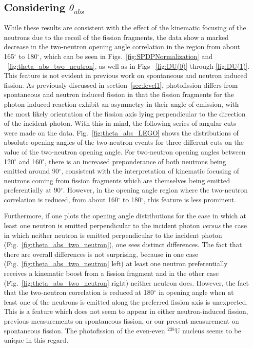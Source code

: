 \subsection{Considering $\theta_{abs}$}
\label{sec:anomaly}
While these results are consistent with the effect of the kinematic focusing of the neutrons due to the recoil of the fission fragments, the data show a marked decrease in the two-neutron opening angle correlation in the region from about 165$^{\circ}$ to 180$^{\circ}$, which can be seen in Figs.~\ref{fig:SPDPNormalization} and ~\ref{fig:theta_abs_two_neutron}, as well as in Figs ~\ref{fig:DU(0)} through \ref{fig:DU(1)}.
This feature is not evident in previous work on spontaneous and neutron induced fission.
As previously discussed in section~\ref{sec:level1}, photofission differs from spontaneous and neutron induced fission in that the fission fragments for the photon-induced reaction exhibit an asymmetry in their angle of emission, with the most likely orientation of the fission axis lying perpendicular to the direction of the incident photon.
With this in mind, the following series of angular cuts were made on the data.
Fig.~\ref{fig:theta_abs_LEGO} shows the distributions of absolute opening angles of the two-neutron events for three different cuts on the value of the two-neutron opening angle.
For two-neutron opening angles between 120$^{\circ}$ and 160$^{\circ}$, there is an increased preponderance of both neutrons being emitted around 90$^{\circ}$, consistent with the interpretation of kinematic focusing of neutrons coming from fission fragments which are themselves being emitted preferentially at 90$^{\circ}$.
However, in the opening angle region where the two-neutron correlation is reduced, from about 160$^{\circ}$ to 180$^{\circ}$, this feature is less prominent.

Furthermore, if one plots the opening angle distributions for the case in which at least one neutron is emitted perpendicular to the incident photon \emph{versus} the case in which neither neutron is emitted perpendicular to the incident photon (Fig.~\ref{fig:theta_abs_two_neutron}), one sees distinct differences.
The fact that there are overall differences is not surprising, because in one case (Fig.~\ref{fig:theta_abs_two_neutron} left) at least one neutron preferentially receives a kinematic boost from a fission fragment and in the other case (Fig.~\ref{fig:theta_abs_two_neutron} right) neither neutron does.
However, the fact that the two-neutron correlation is reduced at 180$^{\circ}$ in opening angle when at least one of the neutrons is emitted along the preferred fission axis is unexpected.
This is a feature which does not seem to appear in either neutron-induced fission, previous measurements on spontaneous fission, or our present measurement on spontaneous fission.
The photofission of the even-even $^{238}$U nucleus seems to be unique in this regard. 


